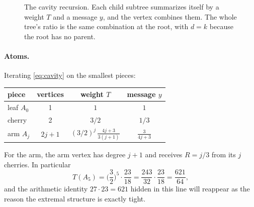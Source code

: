 \documentclass[11pt]{article}
\theoremstyle{definition}
\begin{document}
\begin{figure}[htbp]\centering
{}
\caption{The cavity recursion. Each child subtree summarizes itself by a weight $T$ and a message $y$,
and the vertex combines them. The whole tree's ratio is the same combination at the root, with $d=k$
because the root has no parent.}
\label{fig:cavity}
\end{figure}

\paragraph{Atoms.} Iterating \eqref{eq:cavity} on the smallest pieces:
\begin{center}\small
\begin{tabular}{@{}lccc@{}}
\toprule
piece & vertices & weight $T$ & message $y$\\
\midrule
leaf $A_0$ & 1 & $1$ & $1$\\
cherry & 2 & $3/2$ & $1/3$\\
arm $A_j$ & $2j+1$ & $(3/2)^j\,\frac{4j+3}{3(j+1)}$ & $\frac{3}{4j+3}$\\
\bottomrule
\end{tabular}
\end{center}
For the arm, the arm vertex has degree $j+1$ and receives $R=j/3$ from its $j$ cherries. In particular
\[
  T(A_5)=\Big(\frac32\Big)^5\cdot\frac{23}{18}=\frac{243}{32}\cdot\frac{23}{18}=\frac{621}{64},
\]
and the arithmetic identity $27\cdot23=621$ hidden in this line will reappear as the reason the extremal
structure is exactly tight.
\end{document}
